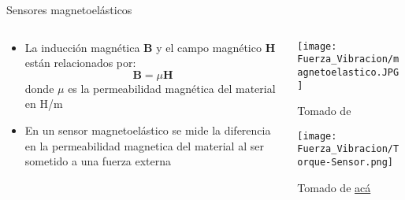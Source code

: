 \documentclass[aspectratio=169]{beamer}
\begin{document}
\begin{frame}{Sensores magnetoelásticos}
    \begin{columns}[c, onlytextwidth]
        \begin{column}{0.6\textwidth}
            \begin{itemize}
                \item La inducción magnética $\mathbf{B}$ y el campo magnético $\mathbf{H}$ están relacionados por:
                \begin{equation*}
                    \mathbf{B} = \mu \mathbf{H}
                \end{equation*}
                donde $\mu$ es la permeabilidad magnética del material en \si{\henry/\meter}
                \item En un sensor magnetoelástico se mide la diferencia en la permeabilidad magnetica del material al ser sometido a una fuerza externa
            \end{itemize}
        \end{column}
        \begin{column}{0.40\textwidth}
            \centering
            \texttt{[image: Fuerza\_Vibracion/magnetoelastico.JPG]}
            
            \tiny{Tomado de \cite{pallas2012sensors}}
            
            \texttt{[image: Fuerza\_Vibracion/Torque-Sensor.png]}
            
            \tiny{Tomado de \href{https://www.methodesensor.com/industries/industrial/torque-sensing/}{acá}}
        \end{column}
    \end{columns}
\end{frame}
\end{document}
